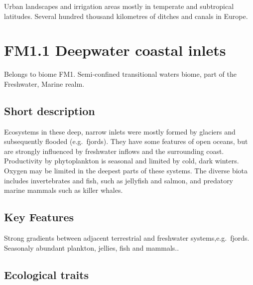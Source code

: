 \documentclass[
  letterpaper,
  DIV=11,
  numbers=noendperiod]{scrartcl}
\begin{document}
Urban landscapes and irrigation areas mostly in temperate and
subtropical latitudes. Several hundred thousand kilometres of ditches
and canals in Europe.

\section{FM1.1 Deepwater coastal
inlets}\label{fm1.1-deepwater-coastal-inlets-1}

Belongs to biome FM1. Semi-confined transitional waters biome, part of
the Freshwater, Marine realm.

\subsection{Short description}\label{short-description-131}

Ecosystems in these deep, narrow inlets were mostly formed by glaciers
and subsequently flooded (e.g.~fjords). They have some features of open
oceans, but are strongly influenced by freshwater inflows and the
surrounding coast. Productivity by phytoplankton is seasonal and limited
by cold, dark winters. Oxygen may be limited in the deepest parts of
these systems. The diverse biota includes invertebrates and fish, such
as jellyfish and salmon, and predatory marine mammals such as killer
whales.

\subsection{Key Features}\label{key-features-131}

Strong gradients between adjacent terrestrial and freshwater
systems,e.g.~fjords. Seasonaly abundant plankton, jellies, fish and
mammals..

\subsection{Ecological traits}\label{ecological-traits-131}
\end{document}
